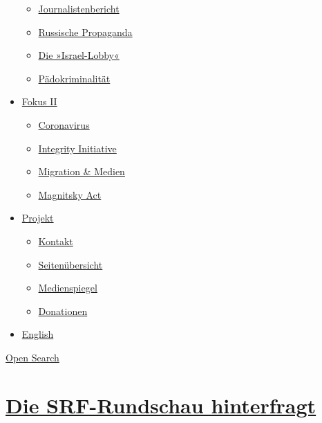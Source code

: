 \begin{itemize}
  \begin{itemize}
  \tightlist
  \item
    \href{https://swprs.org/bericht-eines-journalisten/}{Journalistenbericht}
  \item
    \href{https://swprs.org/russische-propaganda/}{Russische Propaganda}
  \item
    \href{https://swprs.org/die-israel-lobby-fakten-und-mythen/}{Die
    »Israel-Lobby«}
  \item
    \href{https://swprs.org/geopolitik-und-paedokriminalitaet/}{Pädokriminalität}
  \end{itemize}
\item
  \href{https://swprs.org/migration-und-medien/}{Fokus II}

  \begin{itemize}
  \tightlist
  \item
    \href{https://swprs.org/covid-19-hinweis-ii/}{Coronavirus}
  \item
    \href{https://swprs.org/die-integrity-initiative/}{Integrity
    Initiative}
  \item
    \href{https://swprs.org/migration-und-medien/}{Migration \& Medien}
  \item
    \href{https://swprs.org/der-fall-magnitsky/}{Magnitsky Act}
  \end{itemize}
\item
  \href{https://swprs.org/kontakt/}{Projekt}

  \begin{itemize}
  \tightlist
  \item
    \href{https://swprs.org/kontakt/}{Kontakt}
  \item
    \href{https://swprs.org/uebersicht/}{Seitenübersicht}
  \item
    \href{https://swprs.org/medienspiegel/}{Medienspiegel}
  \item
    \href{https://swprs.org/donationen/}{Donationen}
  \end{itemize}
\item
  \href{https://swprs.org/contact/}{English}
\end{itemize}

\protect\hyperlink{}{Open Search}

\hypertarget{die-srf-rundschau-hinterfragt}{%
\section{\texorpdfstring{\href{https://swprs.org/2017/03/01/srf-rundschau/}{Die
SRF-Rundschau
hinterfragt}}{Die SRF-Rundschau hinterfragt}}\label{die-srf-rundschau-hinterfragt}}

